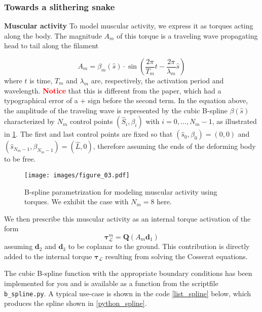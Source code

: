 \documentclass[11pt]{article}
\begin{document}
\subsubsection{Towards a slithering snake}
\label{sec:org00448cb}
\textbf{Muscular activity} To model muscular activity, we express it as torques
 acting along the body. The magnitude \(A_m\) of this torque is a traveling
 wave propagating head to tail along the filament

\[ A_m=\beta_m(\hat{s})\cdot\sin\left(\frac{2\pi}{T_m} t -
											\frac{2\pi}{\lambda_m}
											\hat{s}\right) \]
where \(t\) is time, \(T_m\) and \(\lambda_m\) are,
respectively, the activation period and wavelength. \textbf{\textcolor{red}{Notice}} that this is
different from the paper, which had a typographical error of a + sign before the second term.
In the equation above, the amplitude of the traveling wave is represented by the cubic B-spline \(\beta(\hat{s})\) characterized by \(N_m\) control points \((\hat{S}_i,\beta_i)\) with \(i=0,\dots,N_m-1\), as illustrated in
\cref{fig_spline}. The first and last control points are fixed so that \((\hat{s}_0,\beta_0)=(0,0)\)
and \((\hat{s}_{N_m-1},\beta_{N_m-1})=(\hat{L},0)\), therefore assuming the
ends of the deforming body to be free.

\begin{figure}[htbp]
\centering
\texttt{[image: images/figure\_03.pdf]}
\caption{\label{fig_spline}
B-spline parametrization for modeling muscular activity using torques. We exhibit the case with \(N_m = 8\) here.}
\end{figure}

We then prescribe this muscular activity as an internal torque activation of
the form
\[ \boldsymbol{\tau}^m_{\mathcal{L}} = \mathbf{Q}(A_m\mathbf{d}_1) \]
assuming \(\mathbf{d}_2\) and \(\mathbf{d}_3\) to be coplanar to the ground.
This contribution is directly added to the internal torque
\(\boldsymbol{\tau}_{\mathcal{L}}\) resulting from solving the Cosserat equations.

The cubic B-spline function with the appropriate boundary conditions has
been implemented for you and is available as a function from the scriptfile
\texttt{b\_spline.py}. A typical use-case is shown in the code \cref{list_spline}
below, which produces the spline shown in \cref{python_spline}.
\end{document}
